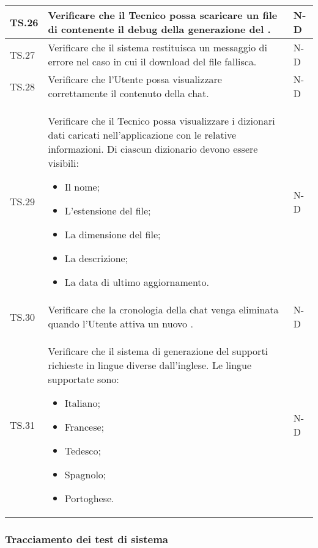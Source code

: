 \begin{adjustwidth}{-0.5cm}{-0.5cm}
\begin{longtable}{|P{1.5cm}|>{\raggedright}P{9.5cm}|>{\arraybackslash}P{1.5cm}|}
		\hline TS.26 & Verificare che il Tecnico possa scaricare un file di  contenente il debug della generazione del . & N-D \\
		\hline TS.27 & Verificare che il sistema restituisca un messaggio di errore nel caso in cui il download del file fallisca. & N-D \\  
		\hline TS.28 & Verificare che l'Utente possa visualizzare correttamente il contenuto della chat. & N-D \\  
		\hline TS.29 & Verificare che il Tecnico possa visualizzare i dizionari dati caricati nell'applicazione con le relative informazioni. Di ciascun dizionario devono essere visibili: 
		\begin{itemize}
			\item Il nome;
			\item L'estensione del file;
			\item La dimensione del file;
			\item La descrizione;
			\item La data di ultimo aggiornamento.
		\end{itemize} & N-D \\  
		\hline TS.30 & Verificare che la cronologia della chat venga eliminata quando l'Utente attiva un nuovo . & N-D \\  
		\hline TS.31 & Verificare che il sistema di generazione del  supporti richieste in lingue diverse dall'inglese. Le lingue supportate sono: 
		\begin{itemize}
			\item Italiano;
			\item Francese;
			\item Tedesco;
			\item Spagnolo;
			\item Portoghese. 
		\end{itemize}
		& N-D \\  
	\end{longtable}
\end{adjustwidth}
\egroup

\subsubsection{Tracciamento dei test di sistema}

